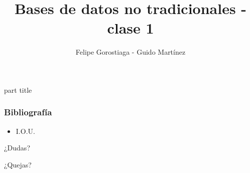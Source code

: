 \documentclass[obeyspaces,spaces,hyphens]{beamer}
\begin{document}
\title{Bases de datos no tradicionales - clase 1}
\author{Felipe Gorostiaga - Guido Martínez}

\begin{frame}
  \titlepage
\end{frame}

\AtBeginSection{\frame{\sectionpage}}

{
	\begin{centering}
	\begin{beamercolorbox}[sep=12pt,center]{part title}
	\bf{\insertsection}\par
	\end{beamercolorbox}
	\end{centering}
}









\begin{frame}
\frametitle{Bibliografía}
\begin{itemize}
	\footnotesize
	\item I.O.U.
\end{itemize}
\end{frame}

\begin{frame}
\begin{center}
	¿Dudas?
	\pause

	¿Quejas?
\end{center}
\end{frame}
\end{document}
